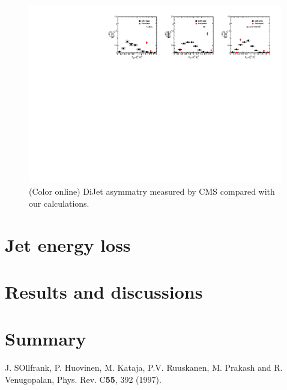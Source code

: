 \documentclass[reprint,amsmath,amssymb,aps,prc,showpacs,showkeys]{revtex4-1}
\begin{document}
\begin{figure}
\includegraphics[width=0.99\textwidth]{Figures/Fig_XJ_Z0Jet_Centrality.pdf}
\caption{(Color online) DiJet asymmatry measured by CMS compared with our calculations.}
\label{Fig:DiJetAsymPt}
\end{figure}



\section{Jet energy loss}
\label{Sec:JetEnergyLoss}

\section{Results and discussions}
\label{Sec:ResultsAndDiss}


\section{Summary}
\label{Sec:Summary}



\begin{thebibliography}{100}
               
 J. SOllfrank, P. Huovinen, M. Kataja, P.V. Ruuskanen,
             M. Prakash and R. Venugopalan, 
             Phys. Rev. C{\bf 55}, 392 (1997).

\end{thebibliography}
\end{document}
